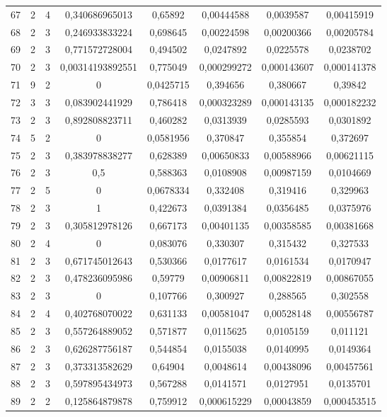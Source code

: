 \begin{longtable}{|c|c|c|c|c|c|c|c|}
67 & 2 & 4 & 0,340686965013 & 0,65892 & 0,00444588 & 0,0039587 & 0,00415919  \\
68 & 2 & 3 & 0,246933833224 & 0,698645 & 0,00224598 & 0,00200366 & 0,00205784  \\
69 & 2 & 3 & 0,771572728004 & 0,494502 & 0,0247892 & 0,0225578 & 0,0238702  \\
70 & 2 & 3 & 0,00314193892551 & 0,775049 & 0,000299272 & 0,000143607 & 0,000141378  \\
71 & 9 & 2 & 0 & 0,0425715 & 0,394656 & 0,380667 & 0,39842  \\
72 & 3 & 3 & 0,083902441929 & 0,786418 & 0,000323289 & 0,000143135 & 0,000182232  \\
73 & 2 & 3 & 0,892808823711 & 0,460282 & 0,0313939 & 0,0285593 & 0,0301892  \\
74 & 5 & 2 & 0 & 0,0581956 & 0,370847 & 0,355854 & 0,372697  \\
75 & 2 & 3 & 0,383978838277 & 0,628389 & 0,00650833 & 0,00588966 & 0,00621115  \\
76 & 2 & 3 & 0,5 & 0,588363 & 0,0108908 & 0,00987159 & 0,0104669  \\
77 & 2 & 5 & 0 & 0,0678334 & 0,332408 & 0,319416 & 0,329963  \\
78 & 2 & 3 & 1 & 0,422673 & 0,0391384 & 0,0356485 & 0,0375976  \\
79 & 2 & 3 & 0,305812978126 & 0,667173 & 0,00401135 & 0,00358585 & 0,00381668  \\
80 & 2 & 4 & 0 & 0,083076 & 0,330307 & 0,315432 & 0,327533  \\
81 & 2 & 3 & 0,671745012643 & 0,530366 & 0,0177617 & 0,0161534 & 0,0170947  \\
82 & 2 & 3 & 0,478236095986 & 0,59779 & 0,00906811 & 0,00822819 & 0,00867055  \\
83 & 2 & 3 & 0 & 0,107766 & 0,300927 & 0,288565 & 0,302558  \\
84 & 2 & 4 & 0,402768070022 & 0,631133 & 0,00581047 & 0,00528148 & 0,00556787  \\
85 & 2 & 3 & 0,557264889052 & 0,571877 & 0,0115625 & 0,0105159 & 0,011121  \\
86 & 2 & 3 & 0,626287756187 & 0,544854 & 0,0155038 & 0,0140995 & 0,0149364  \\
87 & 2 & 3 & 0,373313582629 & 0,64904 & 0,0048614 & 0,00438096 & 0,00457561  \\
88 & 2 & 3 & 0,597895434973 & 0,567288 & 0,0141571 & 0,0127951 & 0,0135701  \\
89 & 2 & 2 & 0,125864879878 & 0,759912 & 0,000615229 & 0,00043859 & 0,000453515  \\

\end{longtable}
